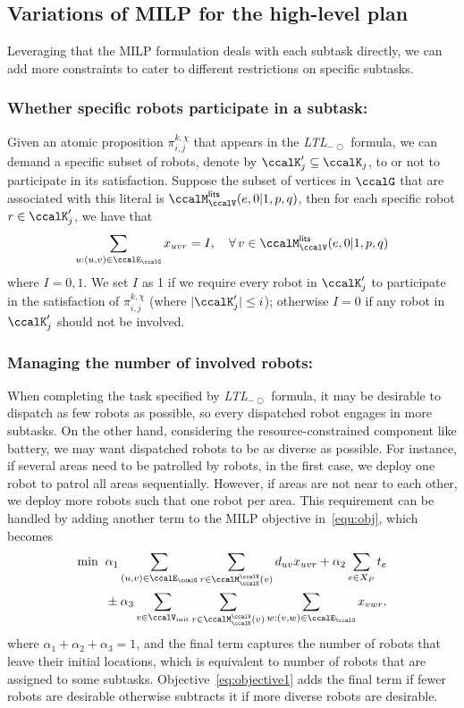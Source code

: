 \documentclass[Afour,sageh,times]{sagej}
\newcommand{\ltl}{ {\it LTL}$_{-\bigcirc}$ }
\renewcommand{\ap}[3]{\mathcal{\pi}_{{#1},{#2}}^{#3}}
\begin{document}
{{\subsection{Variations of MILP for the high-level plan}\label{sec:extension_milp}
Leveraging that the MILP formulation deals with each subtask directly, we can add more constraints to cater to different restrictions on specific subtasks.
\subsubsection{Whether specific robots participate in a subtask:}
Given an atomic proposition $\ap{i}{j}{k,\chi}$ that appears in the \ltl formula, we can demand  a specific subset of robots, denote by  ${\ccalK}'_j \subseteq \ccalK_j$,  to or not to participate in its satisfaction. Suppose the subset of vertices  in $\ccalG$ that are associated with this literal is $\ccalM_{\ccalV}^\mathsf{lits} (e, 0|1, p, q)$,  then for each specific robot $r \in \ccalK'_j$, we have that
\begin{align}
  \sum_{u:(u,v) \in \ccalE_\ccalG} x_{uvr} = I, \quad  \forall \, v \in \ccalM_{\ccalV}^\mathsf{lits} (e, 0|1, p, q)
\end{align}
where $I=0,1$. We set $I$ as 1 if we require every robot in $\ccalK'_j$ to participate in the satisfaction of $\ap{i}{j}{k,\chi}$ (where $|\ccalK'_j|\leq i$); otherwise $I=0$ if any robot in $\ccalK'_j$ should not be involved. %
\subsubsection{Managing the number of involved robots:}
When completing the task specified by \ltl formula, it may be desirable to dispatch as few robots as possible, so  every dispatched robot engages in more subtasks. On the other hand, considering the resource-constrained component like battery,  we may want dispatched robots to be  as diverse as possible. For instance, if several areas need to be patrolled by robots, in the first  case, we deploy one robot to patrol all areas sequentially. However, if areas are not near to each other, we deploy more robots such that one robot per area. This requirement can be handled by adding another term to the MILP objective in~\eqref{equ:obj}, which becomes
\begin{align}\label{eq:objective1}
\min \; \; &  \alpha_1 \sum_{(u,v)\in \ccalE_\ccalG}  \sum_{r \in \ccalM^\ccalV_{\ccalK}(v)} d_{uv} x_{uvr} +  \alpha_2  \sum_{e\in X_P} t_e  \nonumber \\ & \pm  \alpha_3 \sum_{v\in \ccalV_{\text{init}}} \sum_{r \in \ccalM_{\ccalK}^\ccalV(v)} \sum_{w:(v,w)\in \ccalE_\ccalG} x_{vwr},
\end{align}
where $\alpha_1 + \alpha_2 + \alpha_3=1$, and the final term  captures the number of robots that leave their initial locations, which is equivalent to  number of robots that are assigned to some subtasks. Objective~\eqref{eq:objective1} adds the final term if fewer robots are desirable otherwise subtracts it if more diverse robots are desirable.

}}
\end{document}
